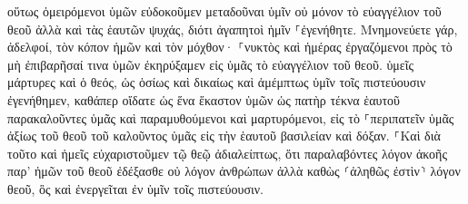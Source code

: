 \documentclass{openreader}
\begin{document}
οὕτως ὁμειρόμενοι ὑμῶν εὐδοκοῦμεν μεταδοῦναι ὑμῖν οὐ μόνον τὸ εὐαγγέλιον τοῦ θεοῦ ἀλλὰ καὶ τὰς ἑαυτῶν ψυχάς, διότι ἀγαπητοὶ ἡμῖν ⸀ἐγενήθητε. 
Μνημονεύετε γάρ, ἀδελφοί, τὸν κόπον ἡμῶν καὶ τὸν μόχθον· ⸀νυκτὸς καὶ ἡμέρας ἐργαζόμενοι πρὸς τὸ μὴ ἐπιβαρῆσαί τινα ὑμῶν ἐκηρύξαμεν εἰς ὑμᾶς τὸ εὐαγγέλιον τοῦ θεοῦ. 
ὑμεῖς μάρτυρες καὶ ὁ θεός, ὡς ὁσίως καὶ δικαίως καὶ ἀμέμπτως ὑμῖν τοῖς πιστεύουσιν ἐγενήθημεν, 
καθάπερ οἴδατε ὡς ἕνα ἕκαστον ὑμῶν ὡς πατὴρ τέκνα ἑαυτοῦ 
παρακαλοῦντες ὑμᾶς καὶ παραμυθούμενοι καὶ μαρτυρόμενοι, εἰς τὸ ⸀περιπατεῖν ὑμᾶς ἀξίως τοῦ θεοῦ τοῦ καλοῦντος ὑμᾶς εἰς τὴν ἑαυτοῦ βασιλείαν καὶ δόξαν. 
⸀Καὶ διὰ τοῦτο καὶ ἡμεῖς εὐχαριστοῦμεν τῷ θεῷ ἀδιαλείπτως, ὅτι παραλαβόντες λόγον ἀκοῆς παρ’ ἡμῶν τοῦ θεοῦ ἐδέξασθε οὐ λόγον ἀνθρώπων ἀλλὰ καθὼς ⸂ἀληθῶς ἐστὶν⸃ λόγον θεοῦ, ὃς καὶ ἐνεργεῖται ἐν ὑμῖν τοῖς πιστεύουσιν. 
\end{document}
